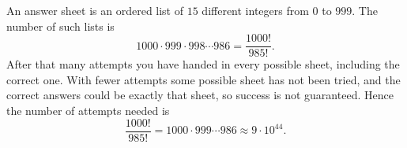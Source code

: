 An answer sheet is an ordered list of $15$ different integers from $0$ to $999$. The number of such lists is
\[
1000\cdot999\cdot998\cdots986=\dfrac{1000!}{985!}.
\]
After that many attempts you have handed in every possible sheet, including the correct one. With fewer attempts some possible sheet has not been tried, and the correct answers could be exactly that sheet, so success is not guaranteed. Hence the number of attempts needed is
\[
\boxed{\dfrac{1000!}{985!}=1000\cdot999\cdots986}\approx9\cdot10^{44}.
\]
